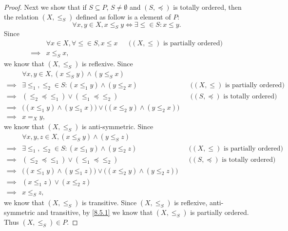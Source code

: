\begin{proof}
  Next we show that if \(S \subseteq P\), \(S \neq \emptyset\) and \((S, \preceq)\) is totally ordered, then the relation \((X, \leq_S)\) defined as follow is a element of \(P\):
  \[
    \forall x, y \in X, x \leq_S y \iff \exists \leq \in S : x \leq y.
  \]
  Since
  \begin{align*}
             & \forall x \in X, \forall \leq \in S, x \leq x &  & \text{(\((X, \leq)\) is partially ordered)} \\
    \implies & x \leq_S x,
  \end{align*}
  we know that \((X, \leq_S)\) is reflexive.
  Since
  \begin{align*}
             & \forall x, y \in X, (x \leq_S y) \land (y \leq_S x)                                                                                        \\
    \implies & \exists \leq_1, \leq_2 \in S : (x \leq_1 y) \land (y \leq_2 x)                           &  & \text{(\((X, \leq)\) is partially ordered)}  \\
    \implies & (\leq_2 \preceq \leq_1) \lor (\leq_1 \preceq \leq_2)                                     &  & \text{(\((S, \preceq)\) is totally ordered)} \\
    \implies & \big((x \leq_1 y) \land (y \leq_1 x)\big) \lor \big((x \leq_2 y) \land (y \leq_2 x)\big)                                                   \\
    \implies & x =_X y,
  \end{align*}
  we know that \((X, \leq_S)\) is anti-symmetric.
  Since
  \begin{align*}
             & \forall x, y, z \in X, (x \leq_S y) \land (y \leq_S z)                                                                                     \\
    \implies & \exists \leq_1, \leq_2 \in S : (x \leq_1 y) \land (y \leq_2 z)                           &  & \text{(\((X, \leq)\) is partially ordered)}  \\
    \implies & (\leq_2 \preceq \leq_1) \lor (\leq_1 \preceq \leq_2)                                     &  & \text{(\((S, \preceq)\) is totally ordered)} \\
    \implies & \big((x \leq_1 y) \land (y \leq_1 z)\big) \lor \big((x \leq_2 y) \land (y \leq_2 z)\big)                                                   \\
    \implies & (x \leq_1 z) \lor (x \leq_2 z)                                                                                                             \\
    \implies & x \leq_S z,
  \end{align*}
  we know that \((X, \leq_S)\) is transitive.
  Since \((X, \leq_S)\) is reflexive, anti-symmetric and transitive, by \cref{8.5.1} we know that \((X, \leq_S)\) is partially ordered.
  Thus \((X, \leq_S) \in P\).


\end{proof}
